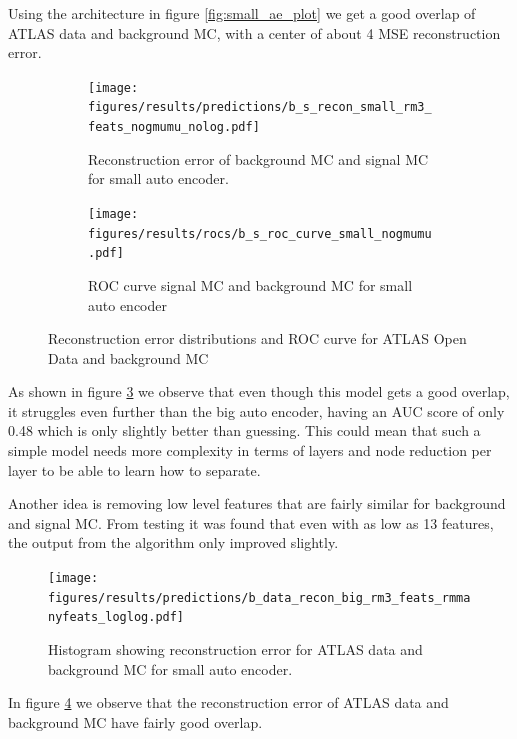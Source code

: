 \documentclass[ reprint, amsmath,amssymb, aps, nofootinbib]{revtex4-2}
\begin{document}
Using the architecture in figure \ref{fig:small_ae_plot} we get a good overlap of ATLAS data and background MC, with a center of about 4 MSE reconstruction error. 

\begin{figure}[h]
     \centering
     \begin{subfigure}[b]{0.46\textwidth}
        \centering
    \texttt{[image: figures/results/predictions/b\_s\_recon\_small\_rm3\_feats\_nogmumu\_nolog.pdf]}
    \caption{Reconstruction error of background MC and signal MC for small auto encoder. }
    \label{fig:s_b_small_pred_}
     \end{subfigure}
     \hfill
     \begin{subfigure}[b]{0.46\textwidth}
         \centering
         \texttt{[image: figures/results/rocs/b\_s\_roc\_curve\_small\_nogmumu.pdf]}
         \caption{ROC curve signal MC and background MC for small auto encoder}
         \label{fig:s_b_small_roc}
     \end{subfigure}
     
        \caption{Reconstruction error distributions and ROC curve for ATLAS Open Data and background MC}
        \label{fig:roc_sig_small}
\end{figure}

As shown in figure \ref{fig:roc_sig_small} we observe that even though this model gets a good overlap, it struggles even further than the big auto encoder, having an AUC score of only 0.48 which is only slightly better than guessing. This could mean that such a simple model needs more complexity in terms of layers and node reduction per layer to be able to learn how to separate.\par 
Another idea is removing low level features that are fairly similar for background and signal MC. From testing it was found that even with as low as 13 features, the output from the algorithm only improved slightly.

\begin{figure}[h]
     \centering
         \texttt{[image: figures/results/predictions/b\_data\_recon\_big\_rm3\_feats\_rmmanyfeats\_loglog.pdf]}
         \caption{Histogram showing reconstruction error for ATLAS data and background MC for small auto encoder.}
     \label{fig:data_b_big_pred_13feats}
\end{figure}

In figure \ref{fig:data_b_big_pred_13feats} we observe that the reconstruction error of ATLAS data and background MC have fairly good overlap. 
\end{document}
